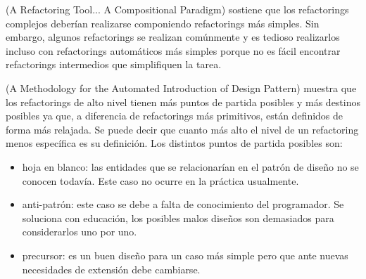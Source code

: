 (A Refactoring Tool... A Compositional Paradigm) sostiene que los refactorings complejos deberían
realizarse componiendo refactorings más simples. Sin embargo, algunos refactorings se realizan
comúnmente y es tedioso realizarlos incluso con refactorings automáticos más simples porque no es
fácil encontrar refactorings intermedios que simplifiquen la tarea. 

(A Methodology for the Automated Introduction of Design Pattern) muestra que los refactorings de alto nivel
tienen más puntos de partida posibles y más destinos posibles ya que, a diferencia de refactorings
más primitivos, están definidos de forma más relajada. Se puede decir que cuanto más alto el nivel
de un refactoring menos específica es su definición. Los distintos puntos de partida posibles son: 

\begin{itemize}
    \item hoja en blanco: las entidades que se relacionarían en el patrón de diseño no se conocen
    todavía. Este caso no ocurre en la práctica usualmente.
    \item anti-patrón: este caso se debe a falta de conocimiento del programador. Se soluciona con
    educación, los posibles malos diseños son demasiados para considerarlos uno por uno.
    \item precursor: es un buen diseño para un caso más simple pero que ante nuevas necesidades de
    extensión debe cambiarse.
\end{itemize}



